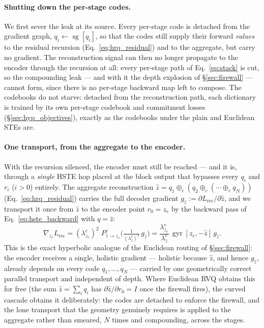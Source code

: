\documentclass[12pt]{report}
\begin{document}
\paragraph{Shutting down the per-stage codes.}
We first sever the leak at its source. Every per-stage code is detached from the gradient graph, $q_i\leftarrow\operatorname{sg}[q_i]$, so that the codes still supply their forward \emph{values} to the residual recursion (Eq.~\ref{eq:hrq_residual}) and to the aggregate, but carry no gradient. The reconstruction signal can then no longer propagate to the encoder through the recursion at all: every per-stage path of Eq.~\ref{eq:stack} is cut, so the compounding leak --- and with it the depth explosion of \S\ref{sec:firewall} --- cannot form, since there is no per-stage backward map left to compose. The codebooks do not starve: detached from the reconstruction path, each dictionary is trained by its own per-stage codebook and commitment losses (\S\ref{sec:hyp_objectives}), exactly as the codebooks under the plain and Euclidean STEs are.

\paragraph{One transport, from the aggregate to the encoder.}
With the recursion silenced, the encoder must still be reached --- and it is, through a \emph{single} HSTE hop placed at the block output that bypasses every $q_i$ and $r_i$ ($i>0$) entirely. The aggregate reconstruction $\hat z = q_1\oplus_c(q_2\oplus_c(\cdots\oplus_c q_N))$ (Eq.~\ref{eq:hrq_residual}) carries the full decoder gradient $g_{\hat z}:=\partial L_{\text{rec}}/\partial\hat z$, and we transport it once from $\hat z$ to the encoder point $r_0=z_e$ by the backward pass of Eq.~\ref{eq:hste_backward} with $q=\hat z$:
\begin{equation}
    \label{eq:block_hste}
    \nabla_{z_e} L_{\text{rec}}
    = (\lambda^c_{z_e})^2\; P^c_{\hat z\to z_e}\!\Big(\tfrac{1}{(\lambda^c_{\hat z})^2}\,g_{\hat z}\Big)
    = \frac{\lambda^c_{z_e}}{\lambda^c_{\hat z}}\,\operatorname{gyr}[z_e,-\hat z]\,g_{\hat z}.
\end{equation}
This is the exact hyperbolic analogue of the Euclidean routing of \S\ref{sec:firewall}: the encoder receives a single, holistic gradient --- holistic because $\hat z$, and hence $g_{\hat z}$, already depends on every code $q_1,\dots,q_N$ --- carried by one geometrically correct parallel transport and independent of depth. Where Euclidean RVQ obtains this for free (the sum $\hat z=\sum_i q_i$ has $\partial\hat z/\partial r_0=I$ once the firewall fires), the curved cascade obtains it deliberately: the codes are detached to enforce the firewall, and the lone transport that the geometry genuinely requires is applied to the aggregate rather than smeared, $N$ times and compounding, across the stages.
\end{document}
